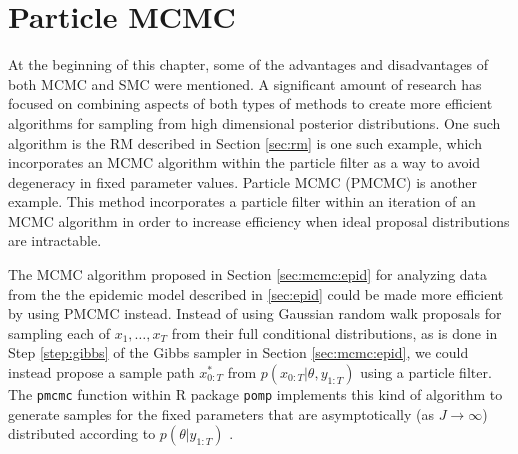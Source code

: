 \section{Particle MCMC \label{sec:pmcmc}}

At the beginning of this chapter, some of the advantages and disadvantages of both MCMC and SMC were mentioned. A significant amount of research has focused on combining aspects of both types of methods to create more efficient algorithms for sampling from high dimensional posterior distributions. One such algorithm is the RM described in Section \ref{sec:rm} is one such example, which incorporates an MCMC algorithm within the particle filter as a way to avoid degeneracy in fixed parameter values. Particle MCMC (PMCMC) \citep{Andr:Douc:Hol:pmcmc:2010} is another example. This method incorporates a particle filter within an iteration of an MCMC algorithm in order to increase efficiency when ideal proposal distributions are intractable.

The MCMC algorithm proposed in Section \ref{sec:mcmc:epid} for analyzing data from the the epidemic model described in \ref{sec:epid} could be made more efficient by using PMCMC instead. Instead of using Gaussian random walk proposals for sampling each of $x_1,\ldots,x_T$ from their full conditional distributions, as is done in Step \ref{step:gibbs} of the Gibbs sampler in Section \ref{sec:mcmc:epid}, we could instead propose a sample path $x_{0:T}^*$ from $p(x_{0:T}|\theta,y_{1:T})$ using a particle filter. The {\tt pmcmc} function within R package {\tt pomp} \citep{pomp} implements this kind of algorithm to generate samples for the fixed parameters that are asymptotically (as $J \rightarrow \infty$) distributed according to $p(\theta|y_{1:T})$ \citep{Andr:Rob:2009:pseudomarg}.

